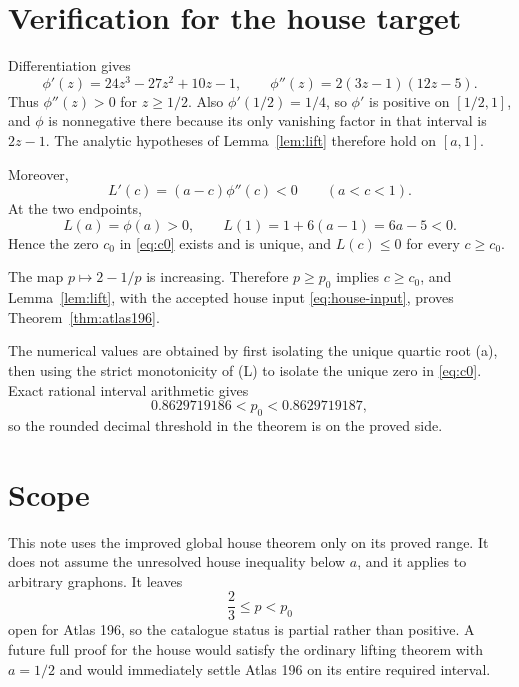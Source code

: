 \documentclass[11pt]{article}
\begin{document}
\section{Verification for the house target}

Differentiation gives
\[
 \phi'(z)=24z^3-27z^2+10z-1,
 \qquad
 \phi''(z)=2(3z-1)(12z-5).
\]
Thus $\phi''(z)>0$ for $z\geq1/2$.  Also
$\phi'(1/2)=1/4$, so $\phi'$ is positive on $[1/2,1]$, and
$\phi$ is nonnegative there because its only vanishing factor in that
interval is $2z-1$.  The analytic hypotheses of
Lemma~\ref{lem:lift} therefore hold on $[a,1]$.

Moreover,
\[
 L'(c)=(a-c)\phi''(c)<0
 \qquad(a<c<1).
\]
At the two endpoints,
\[
 L(a)=\phi(a)>0,
 \qquad
 L(1)=1+6(a-1)=6a-5<0.
\]
Hence the zero $c_0$ in \eqref{eq:c0} exists and is unique, and
$L(c)\leq0$ for every $c\geq c_0$.

The map $p\mapsto2-1/p$ is increasing.  Therefore $p\geq p_0$ implies
$c\geq c_0$, and Lemma~\ref{lem:lift}, with the accepted house input
\eqref{eq:house-input}, proves Theorem~\ref{thm:atlas196}.

The numerical values are obtained by first isolating the unique quartic
root (a), then using the strict monotonicity of (L) to isolate the
unique zero in \eqref{eq:c0}.  Exact rational interval arithmetic gives
\[
 0.8629719186<p_0<0.8629719187,
\]
so the rounded decimal threshold in the theorem is on the proved side.

\section{Scope}

This note uses the improved global house theorem only on its proved range.  It
does not assume the unresolved house inequality below $a$, and it applies
to arbitrary graphons.  It leaves
\[
 \frac23\leq p<p_0
\]
open for Atlas 196, so the catalogue status is partial rather than
positive.  A future full proof for the house would satisfy the ordinary
lifting theorem with $a=1/2$ and would immediately settle Atlas 196 on its
entire required interval.
\end{document}
